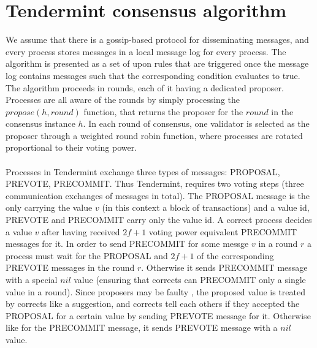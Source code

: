 \documentclass{article}
\begin{document}
   \section{Tendermint consensus algorithm}
   We assume that there is a gossip-based protocol for disseminating messages, and every process stores messages in a local message log for every process. The algorithm is presented as a set of upon rules that are triggered once the message log contains messages such that the corresponding condition evaluates to true. \\
   The algorithm proceeds in rounds, each of it having a dedicated proposer. Processes are all aware of the rounds by simply processing the $propose(h,round)$ function, that returns the proposer for the $round$ in the consensus instance $h$. In each round of consensus, one validator is selected as the proposer through a weighted round robin function, where processes are rotated proportional to their voting power.\\ \\
	Processes in Tendermint exchange three types of messages: PROPOSAL, PREVOTE, PRECOMMIT. Thus Tendermint, requires two voting steps (three communication exchanges of messages in total). The PROPOSAL message is the only carrying the value $v$ (in this context a block of transactions) and a value id, PREVOTE and PRECOMMIT carry only the value id. A correct process decides a value $v$ after having received $2f+1$ voting power equivalent PRECOMMIT messages for it. In order to send PRECOMMIT for some messge $v$ in a round $r$ a process must wait for the PROPOSAL and $2f+1$ of the corresponding PREVOTE messages in the round $r$. Otherwise it sends PRECOMMIT message with a special $nil$ value (ensuring that corrects can PRECOMMIT only a single value in a round). Since proposers may be faulty , the proposed value is treated by corrects like a suggestion, and corrects tell each others if they accepted the PROPOSAL for a certain value by sending PREVOTE message for it. Otherwise like for the PRECOMMIT message, it sends PREVOTE message with a $nil$ value. \\ \\
\end{document}
